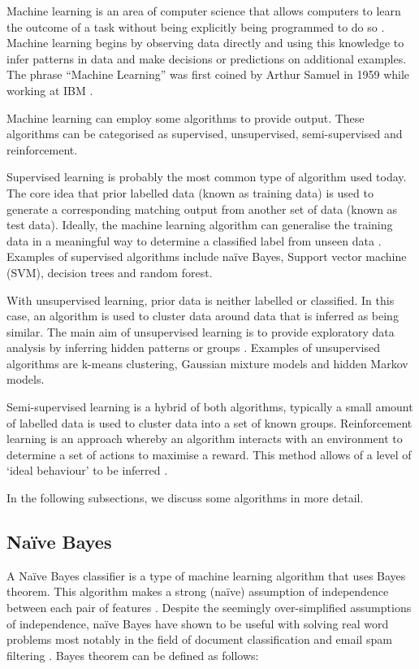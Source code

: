 Machine learning is an area of computer science that allows computers to learn the outcome of a task without being explicitly being programmed to do so \cite{samuel1959some}. Machine learning begins by observing data directly and using this knowledge to infer patterns in data and make decisions or predictions on additional examples. The phrase ``Machine Learning'' was first coined by Arthur Samuel in 1959 while working at IBM \cite{provost1998glossary}. 

Machine learning can employ some algorithms to provide output. These algorithms can be categorised as supervised, unsupervised, semi-supervised and reinforcement. 

Supervised learning is probably the most common type of algorithm used today. The core idea that prior labelled data (known as training data) is used to generate a corresponding matching output from another set of data (known as test data). Ideally, the machine learning algorithm can generalise the training data in a meaningful way to determine a classified label from unseen data \cite{mohri2012foundations}. Examples of supervised algorithms include na\"ive Bayes, Support vector machine (SVM), decision trees and random forest.

With unsupervised learning, prior data is neither labelled or classified. In this case, an algorithm is used to cluster data around data that is inferred as being similar. The main aim of unsupervised learning is to provide exploratory data analysis by inferring hidden patterns or groups \cite{hastie2009unsupervised}. Examples of unsupervised algorithms are k-means clustering, Gaussian mixture models and hidden Markov models.

Semi-supervised learning is a hybrid of both algorithms, typically a small amount of labelled data is used to cluster data into a set of known groups. Reinforcement learning is an approach whereby an algorithm interacts with an environment to determine a set of actions to maximise a reward. This method allows of a level of `ideal behaviour' to be inferred \cite{sutton1998reinforcement}. 

In the following subsections, we discuss some algorithms in more detail.

\subsection{Na\"ive Bayes}

A Na\"ive Bayes classifier is a type of machine learning algorithm that uses Bayes theorem. This algorithm makes a strong (na\"ive) assumption of independence between each pair of features \cite{russell2003artificial}. Despite the seemingly over-simplified assumptions of independence, na\"ive Bayes have shown to be useful with solving real word problems most notably in the field of document classification and email spam filtering \cite{sahami1998bayesian}. Bayes theorem can be defined as follows:

